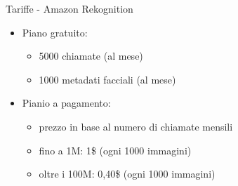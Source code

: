 %
\begin{frame}[t]{Tariffe - Amazon Rekognition}
\begin{itemize}
	\item Piano gratuito:
	\begin{itemize}
		\item 5000 chiamate (al mese)
		\item 1000 metadati facciali (al mese)
	\end{itemize}
	\item Pianio a pagamento:
	\begin{itemize}
		\item prezzo in base al numero di chiamate mensili
		\item fino a 1M: 1\$ (ogni 1000 immagini)
		\item oltre i 100M: 0,40\$ (ogni 1000 immagini)
	\end{itemize}
\end{itemize}
\end{frame}
%
